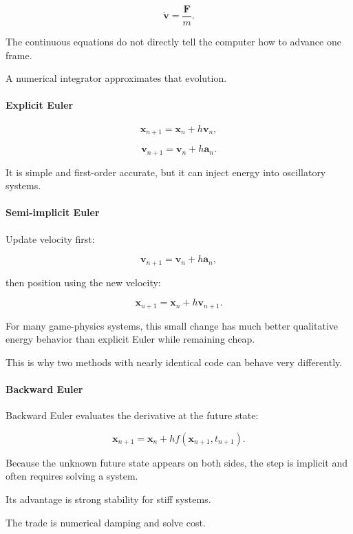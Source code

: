 \[
\dot{\mathbf v}
=
\frac{\mathbf F}{m}.
\]

The continuous equations do not directly tell the computer how to advance one frame.

A numerical integrator approximates that evolution.

\paragraph{Explicit Euler}\label{03-visual-computing-i-ch001-explicit-euler}

\[
\mathbf x_{n+1}
=
\mathbf x_n+h\mathbf v_n,
\]

\[
\mathbf v_{n+1}
=
\mathbf v_n+h\mathbf a_n.
\]

It is simple and first-order accurate, but it can inject energy into oscillatory systems.

\paragraph{Semi-implicit Euler}\label{03-visual-computing-i-ch001-semi-implicit-euler}

Update velocity first:

\[
\mathbf v_{n+1}
=
\mathbf v_n+h\mathbf a_n,
\]

then position using the new velocity:

\[
\mathbf x_{n+1}
=
\mathbf x_n+h\mathbf v_{n+1}.
\]

For many game-physics systems, this small change has much better qualitative energy behavior than explicit Euler while remaining cheap.

This is why two methods with nearly identical code can behave very differently.

\paragraph{Backward Euler}\label{03-visual-computing-i-ch001-backward-euler}

Backward Euler evaluates the derivative at the future state:

\[
\mathbf x_{n+1}
=
\mathbf x_n
+
h f(\mathbf x_{n+1},t_{n+1}).
\]

Because the unknown future state appears on both sides, the step is implicit and often requires solving a system.

Its advantage is strong stability for stiff systems.

The trade is numerical damping and solve cost.

